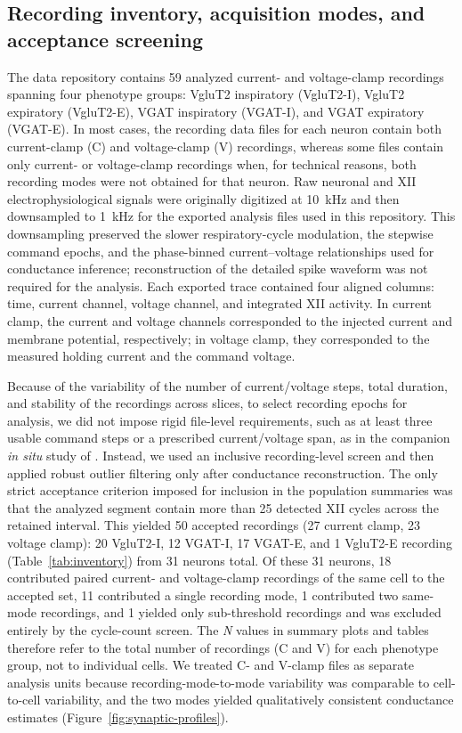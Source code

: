 \documentclass[
]{article}
\newcommand{\figref}[1]{Figure~\ref{#1}}
\begin{document}
\subsection{Recording inventory, acquisition modes, and acceptance screening}\label{recording-inventory-acquisition-modes-and-acceptance-screening}

The data repository contains 59 analyzed current- and voltage-clamp recordings spanning four phenotype groups: VgluT2 inspiratory (VgluT2-I), VgluT2 expiratory (VgluT2-E), VGAT inspiratory (VGAT-I), and VGAT expiratory (VGAT-E). In most cases, the recording data files for each neuron contain both current-clamp (C) and voltage-clamp (V) recordings, whereas some files contain only current- or voltage-clamp recordings when, for technical reasons, both recording modes were not obtained for that neuron. Raw neuronal and XII electrophysiological signals were originally digitized at 10~kHz and then downsampled to 1~kHz for the exported analysis files used in this repository. This downsampling preserved the slower respiratory-cycle modulation, the stepwise command epochs, and the phase-binned current--voltage relationships used for conductance inference; reconstruction of the detailed spike waveform was not required for the analysis. Each exported trace contained four aligned columns: time, current channel, voltage channel, and integrated XII activity. In current clamp, the current and voltage channels corresponded to the injected current and membrane potential, respectively; in voltage clamp, they corresponded to the measured holding current and the command voltage.

Because of the variability of the number of current/voltage steps, total duration, and stability of the recordings across slices, to select recording epochs for analysis, we did not impose rigid file-level requirements, such as at least three usable command steps or a prescribed current/voltage span, as in the companion \emph{in situ} study of \citet{molkov2024inference}. Instead, we used an inclusive recording-level screen and then applied robust outlier filtering only after conductance reconstruction. The only strict acceptance criterion imposed for inclusion in the population summaries was that the analyzed segment contain more than 25 detected XII cycles across the retained interval. This yielded 50 accepted recordings (27 current clamp, 23 voltage clamp): 20 VgluT2-I, 12 VGAT-I, 17 VGAT-E, and 1 VgluT2-E recording (Table~\ref{tab:inventory}) from 31 neurons total. Of these 31 neurons, 18 contributed paired current- and voltage-clamp recordings of the same cell to the accepted set, 11 contributed a single recording mode, 1 contributed two same-mode recordings, and 1 yielded only sub-threshold recordings and was excluded entirely by the cycle-count screen. The \emph{N} values in summary plots and tables therefore refer to the total number of recordings (C and V) for each phenotype group, not to individual cells. We treated C- and V-clamp files as separate analysis units because recording-mode-to-mode variability was comparable to cell-to-cell variability, and the two modes yielded qualitatively consistent conductance estimates (\figref{fig:synaptic-profiles}).
\end{document}
